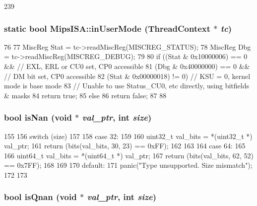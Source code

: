 \begin{DoxyCode}
239 {}
\end{DoxyCode}
\hypertarget{namespaceMipsISA_a1afb0b4065513135cf7543096d80cfc4}{
\subsubsection[{inUserMode}]{\setlength{\rightskip}{0pt plus 5cm}static bool MipsISA::inUserMode ({\bf ThreadContext} $\ast$ {\em tc})}}
\label{namespaceMipsISA_a1afb0b4065513135cf7543096d80cfc4}



\begin{DoxyCode}
76 {
77     MiscReg Stat = tc->readMiscReg(MISCREG_STATUS);
78     MiscReg Dbg = tc->readMiscReg(MISCREG_DEBUG);
79 
80     if ((Stat & 0x10000006) == 0 &&  // EXL, ERL or CU0 set, CP0 accessible
81         (Dbg & 0x40000000) == 0 &&   // DM bit set, CP0 accessible
82         (Stat & 0x00000018) != 0) {  // KSU = 0, kernel mode is base mode
83         // Unable to use Status_CU0, etc directly, using bitfields & masks
84         return true;
85     } else {
86         return false;
87     }
88 }
\end{DoxyCode}
\hypertarget{namespaceMipsISA_acd4560888a946cc49bfa4e4714576355}{
\subsubsection[{isNan}]{\setlength{\rightskip}{0pt plus 5cm}bool isNan (void $\ast$ {\em val\_\-ptr}, \/  int {\em size})}}
\label{namespaceMipsISA_acd4560888a946cc49bfa4e4714576355}



\begin{DoxyCode}
155 {
156     switch (size)
157     {
158       case 32:
159         {
160             uint32_t val_bits = *(uint32_t *) val_ptr;
161             return (bits(val_bits, 30, 23) == 0xFF);
162         }
163 
164       case 64:
165         {
166             uint64_t val_bits = *(uint64_t *) val_ptr;
167             return (bits(val_bits, 62, 52) == 0x7FF);
168         }
169 
170       default:
171         panic("Type unsupported. Size mismatch\n");
172     }
173 }
\end{DoxyCode}
\hypertarget{namespaceMipsISA_ac73ebd248ede21383ddd8a84978d5dbd}{
\subsubsection[{isQnan}]{\setlength{\rightskip}{0pt plus 5cm}bool isQnan (void $\ast$ {\em val\_\-ptr}, \/  int {\em size})}}
\label{namespaceMipsISA_ac73ebd248ede21383ddd8a84978d5dbd}



